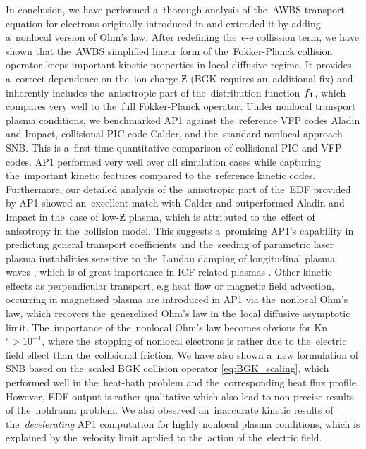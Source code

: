 In conclusion, we have performed a~thorough analysis of the~AWBS transport 
equation for electrons originally introduced in \cite{Sorbo_2015} and extended
it by adding a~nonlocal version of Ohm's law.
After redefining the~e-e collission term, we have shown that the~AWBS
simplified linear form of the~Fokker-Planck collision operator keeps
important kinetic properties in local diffusive regime. 
It provides a~correct dependence 
on the~ion charge $\Zbar$ (BGK requires an~additional fix) and inherently includes
the~anisotropic part of the~distribution function ${\boldsymbol{f_1}}$, which compares
very well to the~full Fokker-Planck operator.
Under nonlocal transport plasma conditions, we benchmarked AP1 against 
the~reference VFP codes Aladin and Impact, collisional PIC code Calder, 
and the~standard nonlocal approach SNB. This is a~first time quantitative
comparison of collisional PIC and VFP codes.
AP1 performed very well over all simulation cases while capturing 
the~important kinetic features compared to the~reference kinetic codes. 
Furthermore, our detailed analysis of the~anisotropic part of the~EDF 
provided by AP1 showed an~excellent match with Calder and outperformed
Aladin and Impact in the~case of low-$\Zbar$ plasma, which is attributed
to the~effect of anisotropy in the~collision model. 
This suggests 
a~promising AP1's capability in predicting general transport coefficients and 
the~seeding of parametric laser plasma instabilities sensitive 
to the~Landau damping of longitudinal plasma waves 
\cite{goldston1995introduction, Sorbo_2015},
which is of great importance in ICF related plasmas 
\cite{Kirkwood_NIFLPI_PPCF2013}.
Other kinetic effects as perpendicular transport, e.g heat flow
or magnetic field advection, occurring in magnetised plasma  
\cite{Walsh_Nernst_PRL2017} are introduced in
AP1 via the~nonlocal Ohm's law, which recovers 
the~generelized Ohm's law in the~local diffusive asymptotic limit.
The~importance of the~nonlocal Ohm's law becomes obvious for Kn$^e > 10^{-1}$,
where the~stopping of nonlocal electrons is rather due to the~electric field 
effect than the~collisional friction.
We have also shown a~new formulation of SNB based on
the~scaled BGK collision operator \eqref{eq:BGK_scaling}, which performed
well in the~heat-bath problem and the~corresponding heat flux profile. 
However, EDF output is rather qualitative which also lead to 
non-precise results of the~hohlraum problem.
We also observed an~inaccurate kinetic results of 
the~\textit{decelerating} AP1 computation for highly nonlocal plasma 
conditions, which is explained by the~velocity limit applied to the~action
of the~electric field. 

